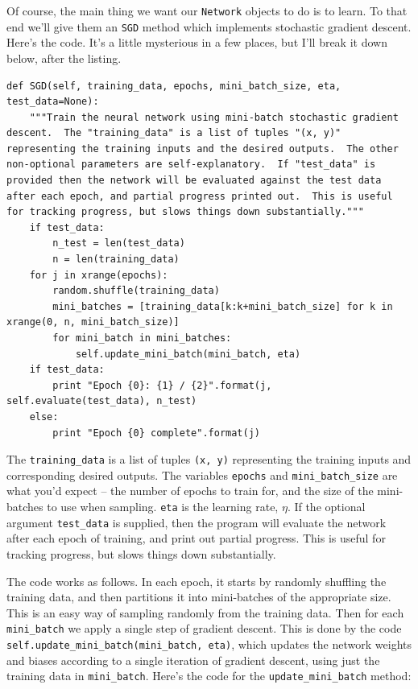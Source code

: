 \documentclass[a4paper,twoside,10pt]{book}
\begin{document}
Of course, the main thing we want our \texttt{Network} objects to do is to learn. To that end we'll give them an \texttt{SGD} method which implements stochastic gradient descent. Here's the code. It's a little mysterious in a few places, but I'll break it down below, after the listing.
\begin{lstlisting}
def SGD(self, training_data, epochs, mini_batch_size, eta, test_data=None):
	"""Train the neural network using mini-batch stochastic gradient descent.  The "training_data" is a list of tuples "(x, y)" representing the training inputs and the desired outputs.  The other non-optional parameters are self-explanatory.  If "test_data" is provided then the network will be evaluated against the test data after each epoch, and partial progress printed out.  This is useful for tracking progress, but slows things down substantially."""
	if test_data:
		n_test = len(test_data)
		n = len(training_data)
	for j in xrange(epochs):
		random.shuffle(training_data)
		mini_batches = [training_data[k:k+mini_batch_size] for k in xrange(0, n, mini_batch_size)]
		for mini_batch in mini_batches:
			self.update_mini_batch(mini_batch, eta)
	if test_data:
		print "Epoch {0}: {1} / {2}".format(j, self.evaluate(test_data), n_test)
	else:
		print "Epoch {0} complete".format(j)
\end{lstlisting}

The \texttt{training\_data} is a list of tuples \texttt{(x, y)} representing the training inputs and corresponding desired outputs. The variables \texttt{epochs} and  \texttt{mini\_batch\_size}  are what you'd expect -- the number of epochs to train for, and the size of the mini-batches to use when sampling. \texttt{eta} is the learning rate, $\eta$. If the optional argument \texttt{test\_data} is supplied, then the program will evaluate the network after each epoch of training, and print out partial progress. This is useful for tracking progress, but slows things down substantially.

The code works as follows. In each epoch, it starts by randomly shuffling the training data, and then partitions it into mini-batches of the appropriate size. This is an easy way of sampling randomly from the training data. Then for each \texttt{mini\_batch} we apply a single step of gradient descent. This is done by the code \texttt{self.update\_mini\_batch(mini\_batch, eta)}, which updates the network weights and biases according to a single iteration of gradient descent, using just the training data in \texttt{mini\_batch}. Here's the code for the \texttt{update\_mini\_batch} method:
\end{document}
